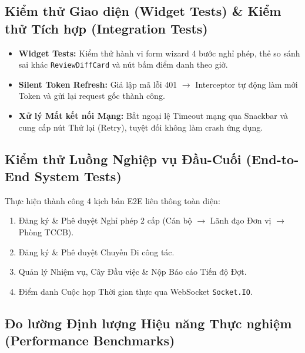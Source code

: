 \subsection{Kiểm thử Giao diện (Widget Tests) \& Kiểm thử Tích hợp (Integration Tests)}
\begin{itemize}
    \item \textbf{Widget Tests:} Kiểm thử hành vi form wizard 4 bước nghỉ phép, thẻ so sánh sai khác \texttt{ReviewDiffCard} và nút bấm điểm danh theo giờ.
    \item \textbf{Silent Token Refresh:} Giả lập mã lỗi 401 $\rightarrow$ Interceptor tự động làm mới Token và gửi lại request gốc thành công.
    \item \textbf{Xử lý Mất kết nối Mạng:} Bắt ngoại lệ Timeout mạng qua Snackbar và cung cấp nút Thử lại (Retry), tuyệt đối không làm crash ứng dụng.
\end{itemize}

\subsection{Kiểm thử Luồng Nghiệp vụ Đầu-Cuối (End-to-End System Tests)}
Thực hiện thành công 4 kịch bản E2E liên thông toàn diện:
\begin{enumerate}
    \item Đăng ký \& Phê duyệt Nghỉ phép 2 cấp (Cán bộ $\rightarrow$ Lãnh đạo Đơn vị $\rightarrow$ Phòng TCCB).
    \item Đăng ký \& Phê duyệt Chuyến Đi công tác.
    \item Quản lý Nhiệm vụ, Cây Đầu việc \& Nộp Báo cáo Tiến độ Đợt.
    \item Điểm danh Cuộc họp Thời gian thực qua WebSocket \texttt{Socket.IO}.
\end{enumerate}

\subsection{Đo lường Định lượng Hiệu năng Thực nghiệm (Performance Benchmarks)}

